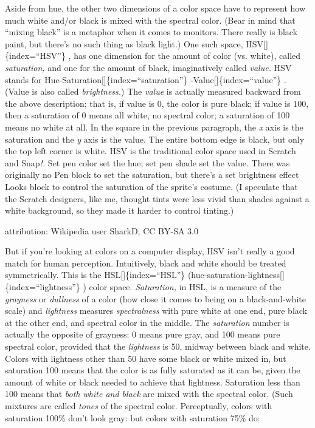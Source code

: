 \documentclass[
  letterpaper,
]{book}
\begin{document}
Aside from hue, the other two dimensions of a color space have to
represent how much white and/or black is mixed with the spectral color.
(Bear in mind that ``mixing black'' is a metaphor when it comes to
monitors. There really is black paint, but there's no such thing as
black light.) One such space, HSV{[}{]}\{index=``HSV''\} , has one
dimension for the amount of color (vs. white), called \emph{saturation,}
and one for the amount of black, imaginatively called \emph{value.} HSV
stands for Hue-Saturation{[}{]}\{index=``saturation''\}
-Value{[}{]}\{index=``value''\} . (Value is also called
\emph{brightness.}) The \emph{value} is actually measured backward from
the above description; that is, if value is 0, the color is pure black;
if value is 100, then a saturation of 0 means all white, no spectral
color; a saturation of 100 means no white at all. In the square in the
previous paragraph, the \emph{x} axis is the saturation and the \emph{y}
axis is the value. The entire bottom edge is black, but only the top
left corner is white. HSV is the traditional color space used in Scratch
and Snap\emph{!.} Set pen color set the hue; set pen shade set the
value. There was originally no Pen block to set the saturation, but
there's a set brightness effect Looks block to control the saturation of
the sprite's costume. (I speculate that the Scratch designers, like me,
thought tints were less vivid than shades against a white background, so
they made it harder to control tinting.)

attribution: Wikipedia user SharkD, CC BY-SA 3.0

But if you're looking at colors on a computer display, HSV isn't really
a good match for human perception. Intuitively, black and white should
be treated symmetrically. This is the HSL{[}{]}\{index=``HSL''\}
(hue-saturation-lightness{[}{]}\{index=``lightness''\} ) color space.
\emph{Saturation,} in HSL, is a measure of the \emph{grayness} or
\emph{dullness} of a color (how close it comes to being on a
black-and-white scale) and \emph{lightness} measures \emph{spectralness}
with pure white at one end, pure black at the other end, and spectral
color in the middle. The \emph{saturation} number is actually the
opposite of grayness: 0 means pure gray, and 100 means pure spectral
color, provided that the \emph{lightness} is 50, midway between black
and white. Colors with lightness other than 50 have some black or white
mixed in, but saturation 100 means that the color is as fully saturated
as it can be, given the amount of white or black needed to achieve that
lightness. Saturation less than 100 means that \emph{both white and
black} are mixed with the spectral color. (Such mixtures are called
\emph{tones} of the spectral color. Perceptually, colors with saturation
100\% don't look gray: but colors with saturation 75\% do:
\end{document}
